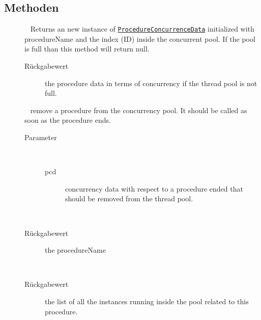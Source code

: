 \subsection{Methoden}
\begin{description}
\item[{\label{ontologyFramework.OFProcedureManagment.ProcedureConcurrenceManager.generateID()}}]
~ Returns an new instance of \texttt{\hyperlink{ontologyFramework.OFProcedureManagment.ProcedureConcurrenceData-class}{ProcedureConcurrenceData}}
 initialized with procedureName and the index (ID)
 inside the concurrent pool. If the pool is full than this 
 method will return null.
\begin{description}
\item[Rückgabewert] 
the procedure data in terms of concurrency if the thread pool is
 not full.
\end{description}
\item[{\label{ontologyFramework.OFProcedureManagment.ProcedureConcurrenceManager.removeID(ontologyFramework.OFProcedureManagment.ProcedureConcurrenceData)}}]
~ remove a procedure from the concurrency pool.
 It should be called as soon as the procedure ends.
\begin{description}
\item[Parameter] ~
\begin{description}
\item[pcd]
concurrency data with respect to a procedure ended that
 should be removed from the thread pool.
\end{description}
\end{description}
\item[{\label{ontologyFramework.OFProcedureManagment.ProcedureConcurrenceManager.getProcedureName()}}]
~ 
\begin{description}
\item[Rückgabewert] 
the procedureName
\end{description}
\item[{\label{ontologyFramework.OFProcedureManagment.ProcedureConcurrenceManager.getProcedureActivated()}}]
~ 
\begin{description}
\item[Rückgabewert] 
the list of all the instances running inside the pool related to 
 this procedure.
\end{description}
\end{description}

